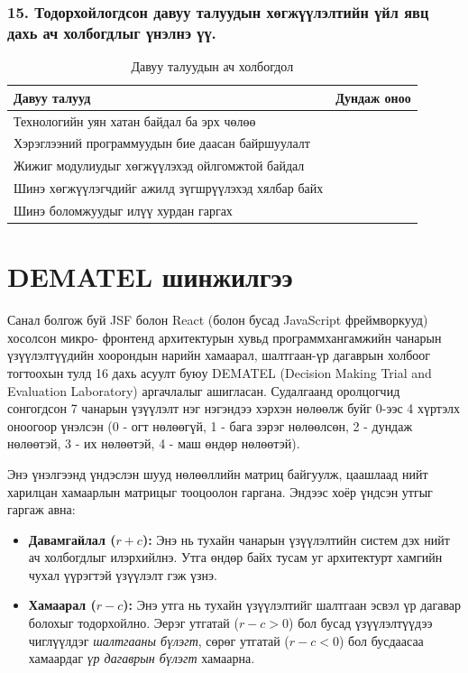 \subsubsection{15. Тодорхойлогдсон давуу талуудын хөгжүүлэлтийн үйл явц дахь ач холбогдлыг үнэлнэ үү.}

\begin{table}[H]
\centering
\renewcommand{\arraystretch}{0.7}
\begin{tabular}{l c}
\toprule
\textbf{Давуу талууд} & \textbf{Дундаж оноо} \\ 
\midrule
Технологийн уян хатан байдал ба эрх чөлөө & \\ 
Хэрэглээний программуудын бие даасан байршуулалт & \\ 
Жижиг модулиудыг хөгжүүлэхэд ойлгомжтой байдал & \\ 
Шинэ хөгжүүлэгчдийг ажилд зүгшрүүлэхэд хялбар байх & \\ 
Шинэ боломжуудыг илүү хурдан гаргах & \\ 
\bottomrule
\end{tabular}
\caption{Давуу талуудын ач холбогдол}
\label{tab:benefits_importance}
\end{table}

\section{DEMATEL шинжилгээ}

Санал болгож буй JSF болон React (болон бусад JavaScript фреймворкууд) хосолсон микро- фронтенд архитектурын хувьд программхангамжийн чанарын үзүүлэлтүүдийн хоорондын нарийн хамаарал, шалтгаан-үр дагаврын холбоог тогтоохын тулд 16 дахь асуулт буюу DEMATEL (Decision Making Trial and Evaluation Laboratory) аргачлалыг ашигласан. Судалгаанд оролцогчид сонгогдсон 7 чанарын үзүүлэлт нэг нэгэндээ хэрхэн нөлөөлж буйг 0-ээс 4 хүртэлх оноогоор үнэлсэн (0 - огт нөлөөгүй, 1 - бага зэрэг нөлөөлсөн, 2 - дундаж нөлөөтэй, 3 - их нөлөөтэй, 4 - маш өндөр нөлөөтэй). 

Энэ үнэлгээнд үндэслэн шууд нөлөөллийн матриц байгуулж, цаашлаад нийт харилцан хамаарлын матрицыг тооцоолон гаргана. Эндээс хоёр үндсэн утгыг гаргаж авна:
\begin{itemize}
    \item \textbf{Давамгайлал ($r+c$):} Энэ нь тухайн чанарын үзүүлэлтийн систем дэх нийт ач холбогдлыг илэрхийлнэ. Утга өндөр байх тусам уг архитектурт хамгийн чухал үүрэгтэй үзүүлэлт гэж үзнэ.
    \item \textbf{Хамаарал ($r-c$):} Энэ утга нь тухайн үзүүлэлтийг шалтгаан эсвэл үр дагавар болохыг тодорхойлно. Эерэг утгатай ($r-c > 0$) бол бусад үзүүлэлтүүдээ чиглүүлдэг \textit{шалтгааны бүлэгт}, сөрөг утгатай ($r-c < 0$) бол бусдаасаа хамаардаг \textit{үр дагаврын бүлэгт} хамаарна.
\end{itemize}

